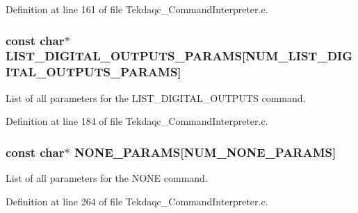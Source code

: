 Definition at line 161 of file Tekdaqc\-\_\-\-Command\-Interpreter.\-c.

\hypertarget{group__command__interpreter_gad3444869609f37e2fcb9ca55ac0b53ef}{
\subsubsection[{L\-I\-S\-T\-\_\-\-D\-I\-G\-I\-T\-A\-L\-\_\-\-O\-U\-T\-P\-U\-T\-S\-\_\-\-P\-A\-R\-A\-M\-S}]{\setlength{\rightskip}{0pt plus 5cm}const char$\ast$ L\-I\-S\-T\-\_\-\-D\-I\-G\-I\-T\-A\-L\-\_\-\-O\-U\-T\-P\-U\-T\-S\-\_\-\-P\-A\-R\-A\-M\-S\mbox{[}{\bf N\-U\-M\-\_\-\-L\-I\-S\-T\-\_\-\-D\-I\-G\-I\-T\-A\-L\-\_\-\-O\-U\-T\-P\-U\-T\-S\-\_\-\-P\-A\-R\-A\-M\-S}\mbox{]}}}\label{group__command__interpreter_gad3444869609f37e2fcb9ca55ac0b53ef}
List of all parameters for the L\-I\-S\-T\-\_\-\-D\-I\-G\-I\-T\-A\-L\-\_\-\-O\-U\-T\-P\-U\-T\-S command. 

Definition at line 184 of file Tekdaqc\-\_\-\-Command\-Interpreter.\-c.

\hypertarget{group__command__interpreter_gae6bcf7679336081f08e81ef76a680c81}{
\subsubsection[{N\-O\-N\-E\-\_\-\-P\-A\-R\-A\-M\-S}]{\setlength{\rightskip}{0pt plus 5cm}const char$\ast$ N\-O\-N\-E\-\_\-\-P\-A\-R\-A\-M\-S\mbox{[}{\bf N\-U\-M\-\_\-\-N\-O\-N\-E\-\_\-\-P\-A\-R\-A\-M\-S}\mbox{]}}}\label{group__command__interpreter_gae6bcf7679336081f08e81ef76a680c81}
List of all parameters for the N\-O\-N\-E command. 

Definition at line 264 of file Tekdaqc\-\_\-\-Command\-Interpreter.\-c.

